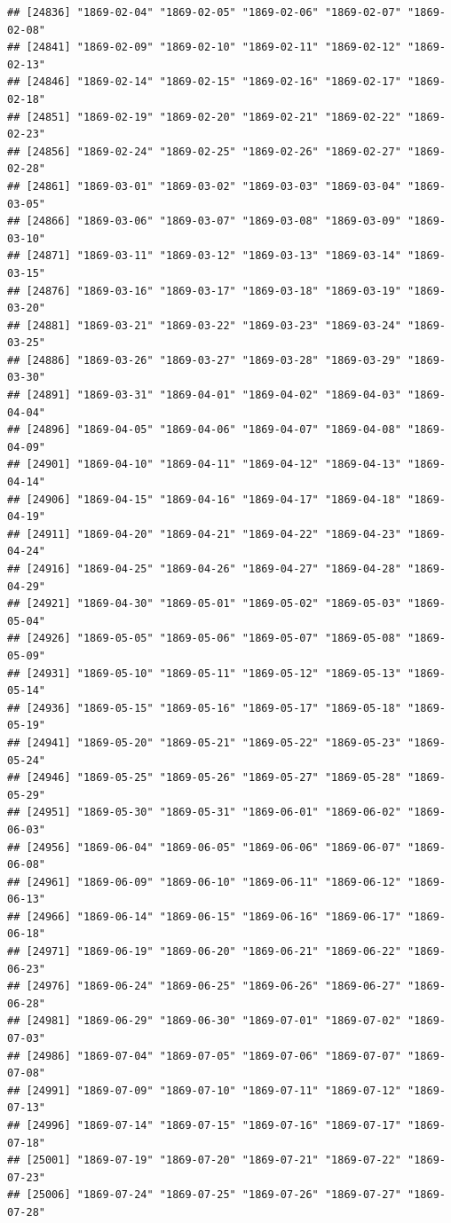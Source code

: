 \documentclass{article}\usepackage[]{graphicx}\usepackage[]{color}
\makeatletter
\newenvironment{kframe}{%
 \def\at@end@of@kframe{}%
 \ifinner\ifhmode%
  \def\at@end@of@kframe{\end{minipage}}%
  \begin{minipage}{\columnwidth}%
 \fi\fi%
 \def\FrameCommand##1{\hskip\@totalleftmargin \hskip-\fboxsep
 \colorbox{shadecolor}{##1}\hskip-\fboxsep
     \hskip-\linewidth \hskip-\@totalleftmargin \hskip\columnwidth}%
 \MakeFramed {\advance\hsize-\width
   \@totalleftmargin\z@ \linewidth\hsize
   \@setminipage}}%
 {\par\unskip\endMakeFramed%
 \at@end@of@kframe}
\newenvironment{knitrout}{}{} %
\makeatother
\begin{document}
\begin{description}
\begin{knitrout}
\begin{kframe}
\begin{verbatim}
## [24836] "1869-02-04" "1869-02-05" "1869-02-06" "1869-02-07" "1869-02-08"
## [24841] "1869-02-09" "1869-02-10" "1869-02-11" "1869-02-12" "1869-02-13"
## [24846] "1869-02-14" "1869-02-15" "1869-02-16" "1869-02-17" "1869-02-18"
## [24851] "1869-02-19" "1869-02-20" "1869-02-21" "1869-02-22" "1869-02-23"
## [24856] "1869-02-24" "1869-02-25" "1869-02-26" "1869-02-27" "1869-02-28"
## [24861] "1869-03-01" "1869-03-02" "1869-03-03" "1869-03-04" "1869-03-05"
## [24866] "1869-03-06" "1869-03-07" "1869-03-08" "1869-03-09" "1869-03-10"
## [24871] "1869-03-11" "1869-03-12" "1869-03-13" "1869-03-14" "1869-03-15"
## [24876] "1869-03-16" "1869-03-17" "1869-03-18" "1869-03-19" "1869-03-20"
## [24881] "1869-03-21" "1869-03-22" "1869-03-23" "1869-03-24" "1869-03-25"
## [24886] "1869-03-26" "1869-03-27" "1869-03-28" "1869-03-29" "1869-03-30"
## [24891] "1869-03-31" "1869-04-01" "1869-04-02" "1869-04-03" "1869-04-04"
## [24896] "1869-04-05" "1869-04-06" "1869-04-07" "1869-04-08" "1869-04-09"
## [24901] "1869-04-10" "1869-04-11" "1869-04-12" "1869-04-13" "1869-04-14"
## [24906] "1869-04-15" "1869-04-16" "1869-04-17" "1869-04-18" "1869-04-19"
## [24911] "1869-04-20" "1869-04-21" "1869-04-22" "1869-04-23" "1869-04-24"
## [24916] "1869-04-25" "1869-04-26" "1869-04-27" "1869-04-28" "1869-04-29"
## [24921] "1869-04-30" "1869-05-01" "1869-05-02" "1869-05-03" "1869-05-04"
## [24926] "1869-05-05" "1869-05-06" "1869-05-07" "1869-05-08" "1869-05-09"
## [24931] "1869-05-10" "1869-05-11" "1869-05-12" "1869-05-13" "1869-05-14"
## [24936] "1869-05-15" "1869-05-16" "1869-05-17" "1869-05-18" "1869-05-19"
## [24941] "1869-05-20" "1869-05-21" "1869-05-22" "1869-05-23" "1869-05-24"
## [24946] "1869-05-25" "1869-05-26" "1869-05-27" "1869-05-28" "1869-05-29"
## [24951] "1869-05-30" "1869-05-31" "1869-06-01" "1869-06-02" "1869-06-03"
## [24956] "1869-06-04" "1869-06-05" "1869-06-06" "1869-06-07" "1869-06-08"
## [24961] "1869-06-09" "1869-06-10" "1869-06-11" "1869-06-12" "1869-06-13"
## [24966] "1869-06-14" "1869-06-15" "1869-06-16" "1869-06-17" "1869-06-18"
## [24971] "1869-06-19" "1869-06-20" "1869-06-21" "1869-06-22" "1869-06-23"
## [24976] "1869-06-24" "1869-06-25" "1869-06-26" "1869-06-27" "1869-06-28"
## [24981] "1869-06-29" "1869-06-30" "1869-07-01" "1869-07-02" "1869-07-03"
## [24986] "1869-07-04" "1869-07-05" "1869-07-06" "1869-07-07" "1869-07-08"
## [24991] "1869-07-09" "1869-07-10" "1869-07-11" "1869-07-12" "1869-07-13"
## [24996] "1869-07-14" "1869-07-15" "1869-07-16" "1869-07-17" "1869-07-18"
## [25001] "1869-07-19" "1869-07-20" "1869-07-21" "1869-07-22" "1869-07-23"
## [25006] "1869-07-24" "1869-07-25" "1869-07-26" "1869-07-27" "1869-07-28"

\end{verbatim}
\end{kframe}
\end{knitrout}
\end{description}
\end{document}
